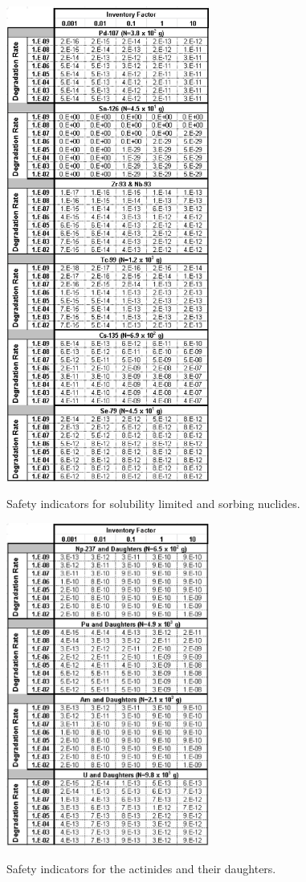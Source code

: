 \begin{table}[h!]
\centering
\includegraphics[width=0.5\textwidth]{./chapters/nuclide_sensitivity/clay/WFDegAndInv/IndicatorsSolLimSorbing.eps}
\caption{Safety indicators for solubility limited and sorbing nuclides.} 
\label{tab:WFDegIndicatorsPdSnZrNb}
\end{table}

\begin{table}[h!]
\centering
\includegraphics[width=0.5\textwidth]{./chapters/nuclide_sensitivity/clay/WFDegAndInv/IndicatorsActinides.eps}
\caption{Safety indicators for the actinides and their daughters.}
\label{tab:WFDegIndicatorsActinides}
\end{table}

